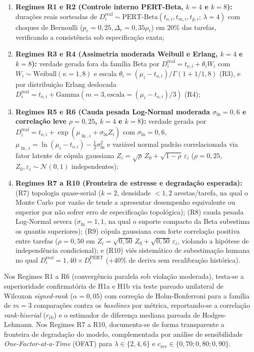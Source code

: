 \documentclass[12pt,openany,oneside,a4paper,english,brazilian,sumario=tradicional]{abntex2}
\begin{document}
\begin{enumerate}
  \item \textbf{Regimes R1 e R2 (Controle interno PERT-Beta, $k=4$ e $k=8$):} durações reais sorteadas de $D_i^{\mathrm{real}} \sim \mathrm{PERT\text{-}Beta}(t_{o,i}, t_{m,i}, t_{p,i};\,\lambda=4)$ com choques de Bernoulli ($p_r=0{,}25, \Delta_r=0{,}35\mu_i$) em $20\%$ das tarefas, verificando a consistência sob especificação exata;
  \item \textbf{Regimes R3 e R4 (Assimetria moderada Weibull e Erlang, $k=4$ e $k=8$):} verdade gerada fora da família Beta por $D_i^{\mathrm{real}} = t_{o,i} + \theta_i W_i$ com $W_i \sim \mathrm{Weibull}(\kappa=1{,}8)$ e escala $\theta_i = (\mu_i - t_{o,i})/\Gamma(1 + 1/1{,}8)$ (R3), e por distribuição Erlang deslocada $D_i^{\mathrm{real}} = t_{o,i} + \mathrm{Gamma}(m=3, \text{escala}=(\mu_i-t_{o,i})/3)$ (R4);
  \item \textbf{Regimes R5 e R6 (Cauda pesada Log-Normal moderada $\sigma_{\ln}=0{,}6$ e correlação leve $\rho=0{,}25$, $k=4$ e $k=8$):} verdade gerada por $D_i^{\mathrm{real}} = t_{o,i} + \exp(\mu_{\ln,i} + \sigma_{\ln} Z_i)$ com $\sigma_{\ln}=0{,}6$, $\mu_{\ln,i} = \ln(\mu_i - t_{o,i}) - \frac{1}{2}\sigma_{\ln}^2$ e variável normal padrão correlacionada via fator latente de cópula gaussiana $Z_i = \sqrt{\rho}\,Z_0 + \sqrt{1-\rho}\,\varepsilon_i$ ($\rho=0{,}25$, $Z_0, \varepsilon_i \sim \mathcal{N}(0,1)$ independentes);
  \item \textbf{Regimes R7 a R10 (Fronteira de estresse e degradação esperada):} (R7) topologia quase-serial ($k=2$, densidade $< 1{,}2$ arestas/tarefa, na qual o Monte Carlo por vazão de  tende a apresentar desempenho equivalente ou superior por não sofrer erro de especificação topológica); (R8) cauda pesada Log-Normal severa ($\sigma_{\ln}=1{,}1$, na qual o suporte compacto da Beta subestima os quantis superiores); (R9) cópula gaussiana com forte correlação positiva entre tarefas ($\rho=0{,}50$ em $Z_i = \sqrt{0{,}50}\,Z_0 + \sqrt{0{,}50}\,\varepsilon_i$, violando a hipótese de independência condicional); e (R10) viés sistemático de subestimação humana no qual $D_i^{\mathrm{real}} = 1{,}40 \times D_i^{\mathrm{PERT}}$ ($+40\%$ de deriva sem recalibração histórica).
\end{enumerate}
Nos Regimes R1 a R6 (convergência paralela sob violação moderada), testa-se a superioridade confirmatória de H1a e H1b via teste pareado unilateral de Wilcoxon \textit{signed-rank} ($\alpha=0{,}05$) com correção de Holm-Bonferroni para a família de $m=3$ comparações contra os \textit{baselines} por métrica, reportando-se a correlação \textit{rank-biserial} ($r_{\mathrm{rb}}$) e o estimador de diferença mediana pareada de Hodges-Lehmann. Nos Regimes R7 a R10, documenta-se de forma transparente a fronteira de degradação do modelo, complementada por análise de sensibilidade \textit{One-Factor-at-a-Time} (OFAT) para $\lambda \in \{2, 4, 6\}$ e $c_{\mathrm{rev}} \in \{0{,}70; 0{,}80; 0{,}90\}$.
\end{document}
